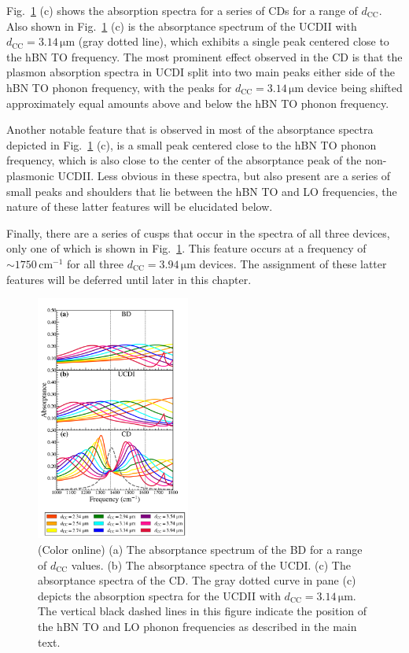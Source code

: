 \documentclass[reprint,
amsmath,amssymb,
aip,
jap,
floatfix,]{revtex4-2}
\begin{document}
				Fig.~\ref{fig:2} (c) shows the absorption spectra for a series of CDs for a range of  $d_\mathrm{CC}$. Also shown in Fig.~\ref{fig:2} (c) is the absorptance spectrum of the UCDII with $d_\mathrm{CC} = 3.14\,\si{\um}$ (gray dotted line), which exhibits a single peak centered close to the hBN TO frequency. The most prominent effect observed in the CD is that the plasmon absorption spectra in UCDI split into two main peaks either side of the hBN TO phonon frequency, with the peaks for $d_\mathrm{CC} = 3.14\,\si{\um}$ device being shifted approximately equal amounts above and below the hBN TO phonon frequency.

				Another notable feature that is observed in most of the absorptance spectra depicted in Fig.~\ref{fig:2} (c), is a small peak centered close to the hBN TO phonon frequency, which is also close to  the center of the absorptance peak of the non-plasmonic UCDII. Less obvious in these spectra, but also present are a series of small peaks and shoulders that lie between the hBN TO and LO frequencies, the nature of these latter features will be elucidated below.  

				Finally, there are a series of cusps that occur in the spectra of all three devices, only one of which is shown in Fig.~\ref{fig:2}. This feature occurs at a frequency of $\sim 1750\,\mathrm{cm}^{-1}$ for all three $d_\mathrm{CC} = 3.94\,\si{\um}$ devices. The assignment of these latter features will be deferred until later in this chapter.

				\begin{figure}[!htb]
				  \centering\includegraphics[width=0.45\textwidth]{Figures/Fig2.pdf}
				  \caption{(Color online) (a) The absorptance spectrum of the BD for a range of $d_\mathrm{CC}$ values. (b) The absorptance spectra of the UCDI. (c) The absorptance spectra of the CD. The gray dotted curve in pane (c) depicts the absorption spectra for the UCDII with $d_\mathrm{CC} = 3.14\,\si{\um}$.  The vertical black dashed lines in this figure indicate the position of the hBN TO and LO phonon frequencies as described in the main text.}
				  \label{fig:2}
				\end{figure}
\end{document}
